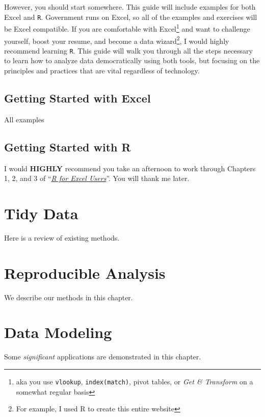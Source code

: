 \documentclass[]{book}
\begin{document}
However, you should start somewhere. This guide will include examples
for both Excel and \texttt{R}. Government runs on Excel, so all of the
examples and exercises will be Excel compatible. If you are comfortable
with Excel\footnote{aka you use \texttt{vlookup}, \texttt{index(match)},
  pivot tables, or \emph{Get \& Transform} on a somewhat regular basis}
and want to challenge yourself, boost your resume, and become a data
wizard\footnote{For example, I used R to create this entire website}, I
would highly recommend learning \texttt{R}. This guide will walk you
through all the steps necessary to learn how to analyze data
democratically using both tools, but focusing on the principles and
practices that are vital regardless of technology.

\section{Getting Started with Excel}\label{getting-started-with-excel}

All examples

\section{Getting Started with R}\label{getting-started-with-r}

I would \textbf{HIGHLY} recommend you take an afternoon to work through
Chapters 1, 2, and 3 of
``\href{https://rstudio-conf-2020.github.io/r-for-excel/index.html}{\emph{R
for Excel Users}}''. You will thank me later.

\chapter{Tidy Data}\label{tidy-data}

Here is a review of existing methods.

\chapter{Reproducible Analysis}\label{reproducible-analysis}

We describe our methods in this chapter.

\chapter{Data Modeling}\label{data-modeling}

Some \emph{significant} applications are demonstrated in this chapter.
\end{document}
